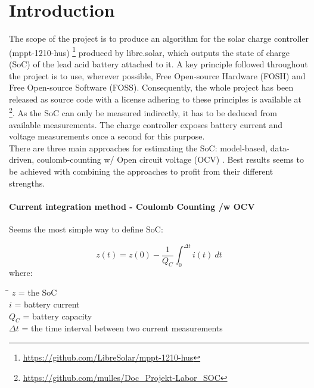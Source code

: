 

\chapter{Introduction}
\label{chap:Introduction}

The scope of the project is to produce an algorithm for the solar charge controller (mppt-1210-hus) \footnote{\url{https://github.com/LibreSolar/mppt-1210-hus}} produced by libre.solar, which outputs the state of charge (SoC) of the lead acid battery attached to it. A key principle followed throughout the project is to use, wherever possible, Free Open-source Hardware (FOSH) and Free Open-source Software (FOSS). Consequently, the whole project has been
released as source code with a license adhering to these principles \cite{Schons_Development_and_validation_2021} is available at \footnote{ \url{https://github.com/mulles/Doc_Projekt-Labor_SOC} }. As the SoC can only be measured indirectly, it has to be deduced from available measurements.  %
The charge controller exposes battery current and voltage measurements once a second for this purpose. \\
There are three main approaches for estimating the SoC: model-based, data-driven, coulomb-counting w/ Open circuit voltage (OCV) \cite{espedal2021current}. Best results seems to be achieved with combining the approaches to profit from their different strengths.


\subsubsection{Current integration method - Coulomb Counting /w OCV }

Seems the most simple way to define SoC:

\begin{equation}
z(t) = z(0) - \frac{1}{{Q_{C}}}\int_{0}^{\Delta t} {i(t)\ dt}
\end{equation}
where: 
\begin{tabbing}
\phantom{$v(t)  \  \ \ \ $}\= \kill
$z  $\> = the SoC  \\
$i  $\> = battery current  \\
$Q_{C}$\> =  battery capacity   \\
$\Delta t$\> = the time interval between two current measurements
\end{tabbing}

